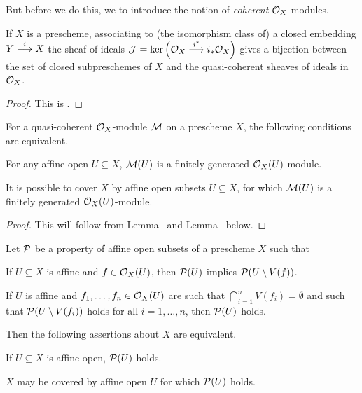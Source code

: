 \documentclass[a4paper,parskip=half,numbers=enddot, DIV=12]{scrreprt}
\begin{document}
But before we do this, we to introduce the notion of \emph{coherent} $\mathcal{O}_X$-modules.
\begin{prop}
	If $X$ is a prescheme, associating to (the isomorphism class of) a closed embedding $Y\morphism[i]X$ the sheaf of ideals $\Jj=\ker\Big(\Oo_X\morphism[i^*]i_*\Oo_X\Big)$ gives a bijection between the set of closed subpreschemes of $X$ and the quasi-coherent sheaves of ideals in $\mathcal{O}_X$.
\end{prop}
\begin{proof}
	This is \cite[Proposition~1.5.3]{alggeo1}.
\end{proof}
\begin{lem}
	For a quasi-coherent $\mathcal{O}_X$-module $\mathcal{M}$ on a prescheme $X$, the following conditions are equivalent.
	\begin{alphanumerate}
		\item For any affine open $U\subseteq X$, $\mathcal{M}(U)$ is a finitely generated $\mathcal{O}_X(U)$-module.
		\item It is possible to cover $X$ by affine open subsets $U\subseteq X$, for which $\mathcal{M}(U)$ is a finitely generated $\mathcal{O}_X(U)$-module.
	\end{alphanumerate}
\end{lem}
\begin{proof}
	This will follow from Lemma~ and Lemma~ below.
\end{proof}
\begin{lem}
	Let $\mathcal{P}$ be a property of affine open subsets of a prescheme $X$ such that
	\begin{alphanumerate}
		\item[\itememph{\alpha}] If $U\subseteq X$ is affine and $f\in\mathcal{O}_X(U)$, then $\mathcal{P}(U)$ implies $\mathcal{P}(U\setminus V(f))$.
		\item[\itememph{\beta}] If $U$ is affine and $f_1,\ldots,f_n\in\mathcal{O}_X(U)$ are such that $\bigcap_{i=1}^nV(f_i)=\emptyset$ and such that $\mathcal{P}(U\setminus V(f_i))$ holds for all $i=1,\ldots,n$, then $\mathcal{P}(U)$ holds.
	\end{alphanumerate}
	Then the following assertions about $X$ are equivalent.
	\begin{alphanumerate}
		\item If $U\subseteq X$ is affine open, $\mathcal{P}(U)$ holds.
		\item $X$ may be covered by affine open $U$ for which $\mathcal{P}(U)$ holds.
	\end{alphanumerate}
\end{lem}
\end{document}
